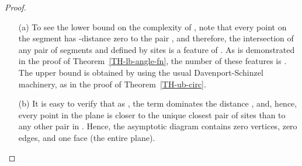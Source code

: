 \documentclass[10pt, conference, compsocconf]{IEEEtran}
\begin{document}
\begin{proof}
   \begin{itemize}

   \item[(a)]
      To see the lower bound on the complexity of ,
      note that every point
      on the segment  has -distance zero to the pair ,
      and therefore, the intersection of any pair of segments  and
       defined by sites  is a feature of
      .
      As is demonstrated in the proof of Theorem~\ref{TH-lb-angle-fn},
      the number of these features is .
      The upper bound is obtained by using the usual Davenport-Schinzel
      machinery, as in the proof of Theorem~\ref{TH-ub-circ}.

   \item[(b)]
      It is easy to verify that as , the term 
      dominates the distance , and, hence, every point 
      in the plane is closer to the unique closest pair of sites
       than to any other pair in .  Hence, the asymptotic
      diagram contains zero vertices, zero edges, and one face (the entire
      plane).


\end{itemize}
\end{proof}
\end{document}
